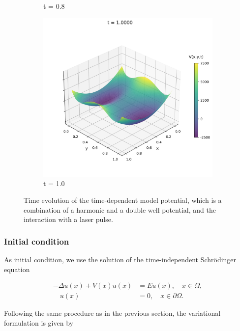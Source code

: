\documentclass{article}
\theoremstyle{definition}
\theoremstyle{plain}
\theoremstyle{remark}
\begin{document}
\begin{figure}[h]
\begin{subfigure}[b]{0.3\textwidth}
    \caption{t = 0.8}
  \end{subfigure}
  \hfill
  \begin{subfigure}[b]{0.3\textwidth}
    \centering
    \includegraphics[width=\textwidth, trim=0cm 0cm 0cm 1cm, clip]{figures/potential_frame_0050.png}
    \caption{t = 1.0}
  \end{subfigure}
  \caption{Time evolution of the time-dependent model potential, which is a combination of a harmonic and a double well potential, and the interaction with a laser pulse.}
  \label{fig:potential_evolution}
\end{figure}

\subsubsection*{Initial condition}

As initial condition, we use the solution of the time-independent Schrödinger equation

  \begin{align*}
    - \Delta u(x) + V(x) u(x) &= E u(x), \quad x \in \Omega,\\
    \quad u(x) &= 0, \quad x \in \partial \Omega.
\end{align*}

Following the same procedure as in the previous section, the variational formulation is given by
\end{document}
